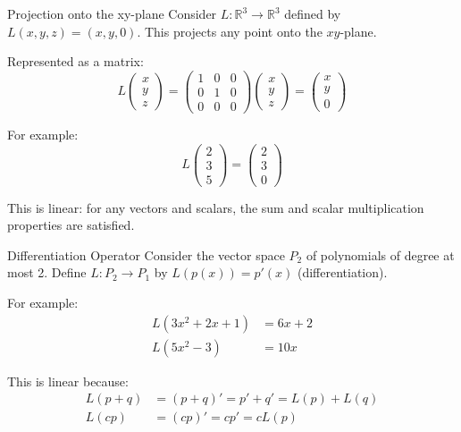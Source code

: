 \documentclass[12pt,a4paper]{article}
\newcommand{\R}{\mathbb{R}}
\begin{document}
	\begin{example}{Projection onto the xy-plane}
		Consider $L: \R^3 \to \R^3$ defined by $L(x, y, z) = (x, y, 0)$. This projects any point onto the $xy$-plane.
		
		Represented as a matrix:
		\[
		L\begin{pmatrix} x \\ y \\ z \end{pmatrix} = \begin{pmatrix} 1 & 0 & 0 \\ 0 & 1 & 0 \\ 0 & 0 & 0 \end{pmatrix} \begin{pmatrix} x \\ y \\ z \end{pmatrix} = \begin{pmatrix} x \\ y \\ 0 \end{pmatrix}
		\]
		
		For example:
		\[
		L\begin{pmatrix} 2 \\ 3 \\ 5 \end{pmatrix} = \begin{pmatrix} 2 \\ 3 \\ 0 \end{pmatrix}
		\]
		
		This is linear: for any vectors and scalars, the sum and scalar multiplication properties are satisfied.
	\end{example}
	
	\begin{example}{Differentiation Operator}
		Consider the vector space $P_2$ of polynomials of degree at most 2. Define $L: P_2 \to P_1$ by $L(p(x)) = p'(x)$ (differentiation).
		
		For example:
		\begin{align*}
			L(3x^2 + 2x + 1) &= 6x + 2 \\
			L(5x^2 - 3) &= 10x
		\end{align*}
		
		This is linear because:
		\begin{align*}
			L(p + q) &= (p + q)' = p' + q' = L(p) + L(q) \\
			L(cp) &= (cp)' = cp' = cL(p)
		\end{align*}
	\end{example}
	
\end{document}
